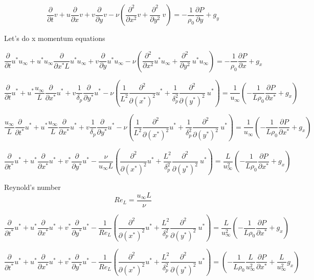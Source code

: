\documentclass[11pt]{article}
\begin{document}
$$\frac{\partial }{\partial t} v + u \frac{\partial}{\partial x} v + v \frac{\partial}{\partial y} v - \nu ( \frac{\partial^2}{\partial x^2} v + \frac{\partial^2}{\partial y^2} \ v ) = - \frac{1}{\rho_0} \frac{\partial P}{\partial y} +g_y$$

Let's do x momentum equations

$$\frac{\partial }{\partial t} u^* u_\infty + u^* u_\infty \frac{\partial}{\partial x^* L} u^* u_\infty + v \frac{\partial}{\partial y} u^* u_\infty - \nu ( \frac{\partial^2}{\partial x^2} u^* u_\infty + \frac{\partial^2}{\partial y^2} \ u^* u_\infty ) = - \frac{1}{\rho_0} \frac{\partial P}{\partial x} +g_x$$


$$\frac{\partial }{\partial t} u^* + u^* \frac{u_\infty}{L} \frac{\partial}{\partial x^* } u^* + v \frac{1}{\delta_p} \frac{\partial}{\partial y^*} u^* - \nu (\frac{1}{L^2} \frac{\partial^2}{\partial (x^*)^2} u^* + \frac{1}{\delta_p^2} \frac{\partial^2}{\partial (y^*)^2} \ u^* ) = \frac{1}{u_\infty} ( - \frac{1}{L \rho_0} \frac{\partial P}{\partial x^*} +g_x)$$

$$\frac{u_\infty}{L}\frac{\partial }{\partial t^*} u^* + u^* \frac{u_\infty}{L} \frac{\partial}{\partial x^* } u^* + v \frac{1}{\delta_p} \frac{\partial}{\partial y^*} u^* - \nu (\frac{1}{L^2} \frac{\partial^2}{\partial (x^*)^2} u^* + \frac{1}{\delta_p^2} \frac{\partial^2}{\partial (y^*)^2} \ u^* ) = \frac{1}{u_\infty} ( - \frac{1}{L \rho_0} \frac{\partial P}{\partial x^*} +g_x)$$


$$\frac{\partial }{\partial t^*} u^* + u^*  \frac{\partial}{\partial x^* } u^* + v^*  \frac{\partial}{\partial y^*} u^* - \frac{\nu}{u_\infty L}  ( \frac{\partial^2}{\partial (x^*)^2} u^* + \frac{L^2}{\delta_p^2} \frac{\partial^2}{\partial (y^*)^2} \ u^* ) = \frac{L}{u_\infty^2} ( - \frac{1}{L \rho_0} \frac{\partial P}{\partial x^*} +g_x)$$

Reynold's number
$$Re_L  = \frac{u_\infty L}{\nu}$$

$$\frac{\partial }{\partial t^*} u^* + u^*  \frac{\partial}{\partial x^* } u^* + v^*  \frac{\partial}{\partial y^*} u^* - \frac{1}{Re_L}  ( \frac{\partial^2}{\partial (x^*)^2} u^* + \frac{L^2}{\delta_p^2} \frac{\partial^2}{\partial (y^*)^2} \ u^* ) = \frac{L}{u_\infty^2} ( - \frac{1}{L \rho_0} \frac{\partial P}{\partial x^*} +g_x)$$

$$\frac{\partial }{\partial t^*} u^* + u^*  \frac{\partial}{\partial x^* } u^* + v^*  \frac{\partial}{\partial y^*} u^* - \frac{1}{Re_L}  ( \frac{\partial^2}{\partial (x^*)^2} u^* + \frac{L^2}{\delta_p^2} \frac{\partial^2}{\partial (y^*)^2} \ u^* ) =  ( - \frac{1}{L \rho_0}  \frac{L}{u_\infty^2} \frac{\partial P}{\partial x^*} + \frac{L}{u_\infty^2}g_x)$$
\end{document}
